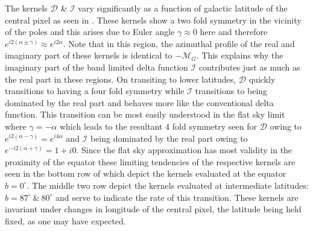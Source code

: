 %

The kernels $\mathcal{D}$ \& $\mathcal{I}$ vary significantly as a function of galactic latitude of the central pixel as seen in . These kernels show a two fold symmetry in the vicinity of the poles and this arises due to Euler angle $\gamma \approx 0$ here and therefore $e^{i2(\alpha \pm \gamma)} \approx e^{i2\alpha}$. Note that in this region, the azimuthal profile of the real and imaginary part of these kernels  is identical to $-\mathcal{M}_G$.  This explains why the imaginary part of the band limited delta function $\mathcal{I}$ contributes just as much as the real part in these regions. On transiting to lower latitudes, $\mathcal{D}$ quickly transitions to having a four fold symmetry while $\mathcal{I}$ transitions to being dominated by the real part and behaves more like the conventional delta function. This transition can be most easily understood in the flat sky limit where $\gamma = -\alpha$ which leads to the resultant 4 fold symmetry seen for $\mathcal{D}$ owing to $e^{i2(\alpha - \gamma)} =e^{i4\alpha}$ and $\mathcal{I}$ being dominated by the real part owing to $e^{-i2(\alpha + \gamma)} =1 + i0$. Since the flat sky approximation has most validity in the proximity of the equator these limiting tendencies of the respective kernels are seen in the bottom row of  which depict the kernels evaluated at the equator $b=0^{\circ}$. The middle two row depict the kernels evaluated at intermediate latitudes: $b=87^{\circ}~\&~ 80^{\circ}$ and serve to indicate the rate of this transition. These kernels are invariant under changes in longitude of the central pixel, the latitude being held fixed, as one may have expected.

